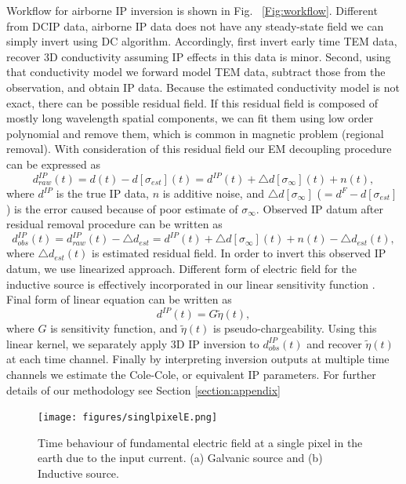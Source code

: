 \documentclass[letterpaper,11pt]{article}
\newcommand{\siginf}{\sigma_\infty}
\newcommand{\peta}{\tilde{\eta}}
\newcommand{\dip}{d^{IP}}
\begin{document}
Workflow for airborne IP inversion is shown in Fig. ~\ref{Fig:workflow}. Different from DCIP data, airborne IP data does not have any steady-state field we can simply invert using DC algorithm. Accordingly, first invert early time TEM data, recover 3D conductivity assuming IP effects in this data is minor. Second, using that conductivity model we forward model TEM data, subtract those from the observation, and obtain IP data. Because the estimated conductivity model is not exact, there can be possible residual field. If this residual field is composed of mostly long wavelength spatial components, we can fit them using low order polynomial and remove them, which is common in magnetic problem (regional removal). With consideration of this residual field our EM decoupling procedure can be expressed as 
\begin{equation}
  \dip_{raw}(t) = d(t) - d[\sigma_{est}](t) = \dip(t) + \triangle d[\siginf](t) + n(t),
  \label{eq: IPdatum_raw}
\end{equation}
where $\dip$ is the true IP data, $n$ is additive noise, and $\triangle d[\siginf]$ ($=d^{F}-d[\sigma_{est}]$) is the error caused because of poor estimate of $\siginf$. 
Observed IP datum after residual removal procedure can be written as 
\begin{equation}
  \dip_{obs}(t) = \dip_{raw}(t) - \triangle d_{est} = \dip(t) + \triangle d[\siginf](t) + n(t) - \triangle d_{est}(t),
  \label{eq: IPdatum_obs}
\end{equation}
where $\triangle d_{est}(t)$ is estimated residual field. 
In order to invert this observed IP datum, we use linearized approach. Different form of electric field for the inductive source is effectively incorporated in our linear sensitivity function \cite[]{Kang2015c}. Final form of linear equation can be written as 
\begin{equation}
  \dip(t) = G\peta(t),
  \label{eq:linearIPdatum}
\end{equation}
where $G$ is sensitivity function, and $\peta(t)$ is pseudo-chargeability. Using this linear kernel, we separately apply 3D IP inversion to $\dip_{obs}(t)$ and recover $\peta(t)$ at each time channel. Finally by interpreting inversion outputs at multiple time channels we estimate the Cole-Cole, or equivalent IP parameters. For further details of our methodology see Section \ref{section:appendix}

\begin{figure}[htb]
  \centering
  \texttt{[image: figures/singlpixelE.png]}
  \caption{Time behaviour of fundamental electric field at a single pixel in the earth due to the input current. (a) Galvanic source and (b) Inductive source. }
  \label{Fig:singlpixelE}
\end{figure}
\end{document}
